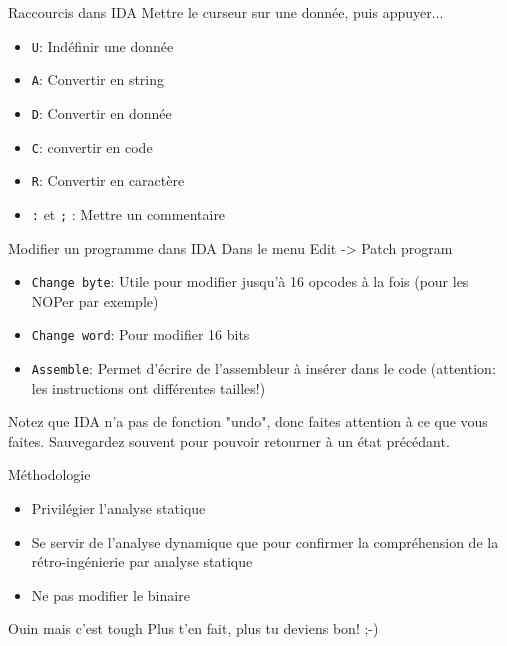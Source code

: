 \documentclass[10pt,xcolor={table,dvipsnames},t]{beamer}
\begin{document}
\begin{frame}{Raccourcis dans IDA}
    Mettre le curseur sur une donnée, puis appuyer...
    \begin{itemize}
        \item \texttt{U}: Indéfinir une donnée
        \item \texttt{A}: Convertir en string
        \item \texttt{D}: Convertir en donnée
        \item \texttt{C}: convertir en code
        \item \texttt{R}: Convertir en caractère
        \item \texttt{:} et \texttt{;} : Mettre un commentaire
    \end{itemize}
\end{frame}


\begin{frame}{Modifier un programme dans IDA}
    Dans le menu Edit -> Patch program
    \begin{itemize}
        \item \texttt{Change byte}: Utile pour modifier jusqu'à 16 opcodes à la fois (pour les NOPer par exemple)
        \item \texttt{Change word}: Pour modifier 16 bits
        \item \texttt{Assemble}: Permet d'écrire de l'assembleur à insérer dans le code (attention: les instructions ont différentes tailles!)
    \end{itemize}
    
    Notez que IDA n'a pas de fonction "undo", donc faites attention à ce que vous faites. Sauvegardez souvent pour pouvoir retourner à un état précédant.
\end{frame}

\begin{frame}{Méthodologie}
    \begin{itemize}
        \item Privilégier l'analyse statique
        \item Se servir de l'analyse dynamique que pour confirmer la compréhension de la rétro-ingénierie par analyse statique
        \item Ne pas modifier le binaire
    \end{itemize}
    
    \begin{block}{Ouin mais c'est tough}
        Plus t'en fait, plus tu deviens bon!  ;-)
    \end{block}
\end{frame}
\end{document}
